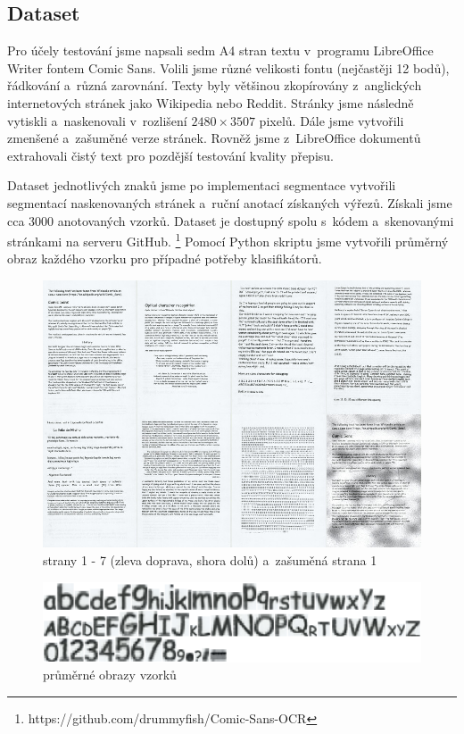 \documentclass[12pt]{article}
\begin{document}
\subsection{Dataset}
\label{sec:dataset}

Pro účely testování jsme napsali sedm A4 stran textu v~programu LibreOffice Writer fontem Comic Sans. Volili jsme
různé velikosti fontu (nejčastěji 12 bodů), řádkování a~různá zarovnání. Texty byly většinou zkopírovány z~anglických internetových
stránek jako Wikipedia nebo Reddit. Stránky jsme následně vytiskli a~naskenovali v~rozlišení $2480 \times 3507$ pixelů.
Dále jsme vytvořili zmenšené a~zašuměné verze stránek. Rovněž jsme z~LibreOffice dokumentů extrahovali čistý text
pro pozdější testování kvality přepisu.

Dataset jednotlivých znaků jsme po implementaci segmentace vytvořili segmentací naskenovaných stránek a~ruční
anotací získaných výřezů. Získali jsme cca 3000 anotovaných vzorků. Dataset je dostupný spolu s~kódem a~skenovanými stránkami
na serveru GitHub. \footnote{https://github.com/drummyfish/Comic-Sans-OCR} Pomocí Python skriptu jsme
vytvořili průměrný obraz každého vzorku pro případné potřeby klasifikátorů.

\begin{figure}[htb]
  \centering
  \includegraphics[width=13.5cm,keepaspectratio]{pages.jpg}
  \caption{strany 1 - 7 (zleva doprava, shora dolů) a~zašuměná strana 1}
  \label{fig:pages}
\end{figure}

\begin{figure}[htb]
  \centering
  \includegraphics[width=13.5cm,keepaspectratio]{averages.png}
  \caption{průměrné obrazy vzorků}
  \label{fig:avg}
\end{figure}
\end{document}
